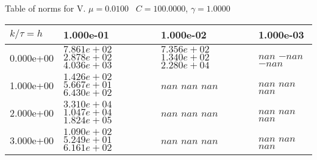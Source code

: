 \begin{center}
Table of norms for V. $\mu = 0.0100$ \, $C = 100.0000$, $\gamma = 1.0000$
  
\begin{tabular}{|p{1in}|p{1in}|p{1in}|p{1in}|} \hline
$k / \tau = h$ &1.000e-01 &1.000e-02 &1.000e-03 \\ \hline 
0.000e+00 & $7.861e+02$  $2.878e+02$  $4.036e+03$  & $7.356e+02$  $1.340e+02$  $2.280e+04$  & $nan$  $-nan$  $-nan$  \\ \hline 
1.000e+00 & $1.426e+02$  $5.667e+01$  $6.430e+02$  & $nan$  $nan$  $nan$  & $nan$  $nan$  $nan$  \\ \hline 
2.000e+00 & $3.310e+04$  $1.047e+04$  $1.824e+05$  & $nan$  $nan$  $nan$  & $nan$  $nan$  $nan$  \\ \hline 
3.000e+00 & $1.090e+02$  $5.249e+01$  $6.161e+02$  & $nan$  $nan$  $nan$  & $nan$  $nan$  $nan$  \\ \hline 

\end{tabular}\\[20pt]
\end{center}
